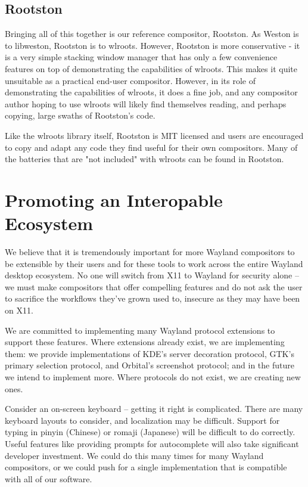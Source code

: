 \documentclass{article}
\begin{document}
\subsection{Rootston}

Bringing all of this together is our reference compositor, Rootston. As Weston
is to libweston, Rootston is to wlroots. However, Rootston is more conservative -
it is a very simple stacking window manager that has only a few convenience
features on top of demonstrating the capabilities of wlroots. This makes it
quite unsuitable as a practical end-user compositor. However, in its role of
demonstrating the capabilities of wlroots, it does a fine job, and any
compositor author hoping to use wlroots will likely find themselves reading, and
perhaps copying, large swaths of Rootston's code.

Like the wlroots library itself, Rootston is MIT licensed and users are
encouraged to copy and adapt any code they find useful for their own
compositors. Many of the batteries that are "not included" with wlroots can be
found in Rootston.

\section{Promoting an Interopable Ecosystem}

We believe that it is tremendously important for more Wayland compositors to be
extensible by their users and for these tools to work across the entire Wayland
desktop ecosystem. No one will switch from X11 to Wayland for security alone --
we must make compositors that offer compelling features and do not ask the user
to sacrifice the workflows they've grown used to, insecure as they may have been
on X11.

We are committed to implementing many Wayland protocol extensions to support
these features. Where extensions already exist, we are implementing them: we
provide implementations of KDE's server decoration protocol, GTK's primary
selection protocol, and Orbital's screenshot protocol; and in the future we
intend to implement more. Where protocols do not exist, we are creating new
ones.

Consider an on-screen keyboard -- getting it right is complicated. There are
many keyboard layouts to consider, and localization may be difficult. Support
for typing in pinyin (Chinese) or romaji (Japanese) will be difficult to do
correctly. Useful features like providing prompts for autocomplete will also
take significant developer investment. We could do this many times for many
Wayland compositors, or we could push for a single implementation that is
compatible with all of our software.
\end{document}
